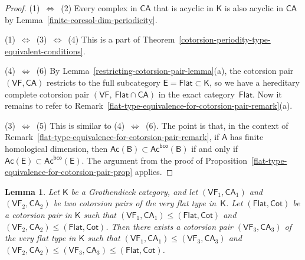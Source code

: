 \documentclass[12pt,a4paper]{amsart}
\newcommand{\+}{\nobreakdash-}
\renewcommand{\:}{\colon}
\newcommand{\sA}{\mathsf A}
\newcommand{\sB}{\mathsf B}
\newcommand{\sE}{\mathsf E}
\newcommand{\sK}{\mathsf K}
\newcommand{\VF}{\mathsf{VF}}
\newcommand{\CA}{\mathsf{CA}}
\newcommand{\Flat}{\mathsf{Flat}}
\newcommand{\Cot}{\mathsf{Cot}}
\newcommand{\Ac}{\mathsf{Ac}}
\newcommand{\bco}{\mathsf{bco}}
\theoremstyle{plain}
\newtheorem{lem}[thm]{Lemma}
\theoremstyle{definition}
\begin{document}
\begin{proof}
 (1)~$\Longleftrightarrow$~(2)
 Every complex in $\CA$ that is acyclic in $\sK$ is also acyclic
in $\CA$ by Lemma~\ref{finite-coresol-dim-periodicity}.

 (1)~$\Longleftrightarrow$~(3)~$\Longleftrightarrow$~(4)
 This is a part of
Theorem~\ref{cotorsion-periodity-type-equivalent-conditions}.

 (4)~$\Longleftrightarrow$~(6)
 By Lemma~\ref{restricting-cotorsion-pair-lemma}(a), the cotorsion pair
$(\VF,\CA)$ restricts to the full subcategory $\sE=\Flat\subset\sK$,
so we have a hereditary complete cotorsion pair $(\VF,\>\Flat\cap\CA)$
in the exact category~$\Flat$.
 Now it remains to refer to
Remark~\ref{flat-type-equivalence-for-cotorsion-pair-remark}(a).

 (3)~$\Longleftrightarrow$~(5)
 This is similar to (4)~$\Leftrightarrow$~(6).
 The point is that, in the context of
Remark~\ref{flat-type-equivalence-for-cotorsion-pair-remark}, if
$\sA$ has finite homological dimension, then $\Ac(\sB)\subset
\Ac^\bco(\sB)$ if and only if $\Ac(\sE)\subset\Ac^\bco(\sE)$.
 The argument from the proof of
Proposition~\ref{flat-type-equivalence-for-cotorsion-pair-prop} applies.
\end{proof}

\begin{lem} \label{majorating-very-flat-type-pair}
 Let\/ $\sK$ be a Grothendieck category, and let $(\VF_1,\CA_1)$ and
$(\VF_2,\CA_2)$ be two cotorsion pairs of the very flat type in\/~$\sK$.
 Let $(\Flat,\Cot)$ be a cotorsion pair in\/ $\sK$ such that
$(\VF_1,\CA_1)\le(\Flat,\Cot)$ and $(\VF_2,\CA_2)\le(\Flat,\Cot)$.
 Then there exists a cotorsion pair $(\VF_3,\CA_3)$ of the very flat
type in\/ $\sK$ such that $(\VF_1,\CA_1)\le(\VF_3,\CA_3)$ and
$(\VF_2,\CA_2)\le(\VF_3,\CA_3)\le(\Flat,\Cot)$.
\end{lem}
\end{document}
